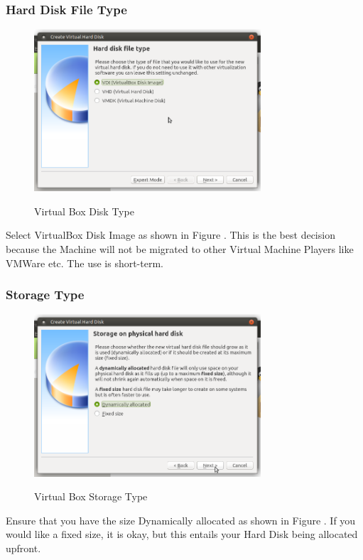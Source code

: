 \subsubsection{Hard Disk File Type}
\begin{figure}[!htb]
    \centering
    \includegraphics[width=0.752\textwidth]{images/00-03.png}\\[0cm]  
    \caption[Virtual Box]{Virtual Box Disk Type}
    \label{fig:00-04 - Linux Virtual Box Disk Type} 
\end{figure}
Select VirtualBox Disk Image as shown in Figure .
This is the best decision because the Machine will not be migrated to other
Virtual Machine Players like VMWare etc. The use is short-term.

\subsubsection{Storage Type}
\begin{figure}[!htb]
    \centering
    \includegraphics[width=0.752\textwidth]{images/00-04.png}\\[0cm]  
    \caption[Virtual Box]{Virtual Box Storage Type}
    \label{fig:00-05 - Linux Virtual Box Storage Type} 
\end{figure}
Ensure that you have the size Dynamically allocated as shown in Figure .
If you would like a fixed size, it is okay, but this entails your Hard Disk
being allocated upfront.

